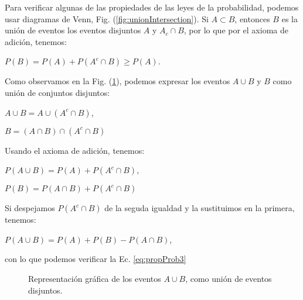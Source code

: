 Para verificar algunas de las propiedades de las leyes de la probabilidad,
podemos usar diagramas de Venn, Fig. (\ref{fig:unionIntersection}). Si $A \subset
B$, entonces $B$ es la unión de eventos los eventos disjuntos $A$ y $A_c \cap
B$, por lo que por el axioma de adición, tenemos:

\begin{center}
    $P(B) = P(A) + P(A^c \cap B) \geq P(A)$.
\end{center}

Como observamos en la Fig. (\ref{fig:difer}), podemos expresar los eventos $A
\cup B$ y $B$ como unión de conjuntos disjuntos:

\begin{center}
    $A \cup B = A \cup (A^c \cap B)$,
\end{center}

\begin{center}
    $B = (A \cap B) \cap (A^c \cap B)$
\end{center}

Usando el axioma de adición, tenemos:

\begin{center}
    $P(A \cup B) = P(A) + P(A^c \cap B)$,
\end{center}

\begin{center}
    $P(B) = P(A \cap B) + P(A^c \cap B)$
\end{center}

Si despejamos $P(A^c \cap B)$ de la seguda igualdad y la sustituimos en la
primera, tenemos:

\begin{center}
    $P(A \cup B) = P(A) + P(B) - P(A \cap B)$,
\end{center}

con lo que podemos verificar la Ec. \eqref{eq:propProb3}

\begin{figure}
\centering
{}
\caption{Representación gráfica de los eventos $A \cup B$, como unión de eventos disjuntos.}
\label{fig:difer}
\end{figure}

